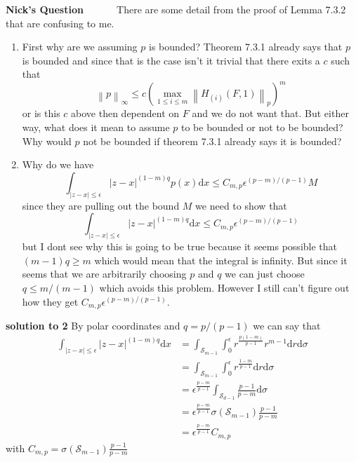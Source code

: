 \documentclass[a4paper,11pt]{article}
\numberwithin{equation}{section}
\theoremstyle{plain}
\theoremstyle{definition}
\newcommand{\ud}{\ensuremath{\mathrm{d}}}
\newcommand{\Norm}[1]{\left\|  #1   \right\|}
\newcounter{NQ}
\newenvironment{NickQuestion}[1][] %
{\refstepcounter{NQ}
	\begin{mdframed}[backgroundcolor=lightgray]\textbf{Nick's Question \theNQ \: #1~~}~~~\noindent}%
	{\end{mdframed}}
\numberwithin{NQ}{section}
\numberwithin{LQ}{section}
\numberwithin{ZQ}{section}
\begin{document}
\begin{NickQuestion}
	There are some detail from the proof of Lemma 7.3.2 that are confusing to me. \begin{enumerate}
		\item First why are we assuming $p$ is bounded? Theorem 7.3.1 already says that $p$ is bounded and since that is the case isn't it trivial that there exits a $c$ such that
		\[
		\Norm{p}_\infty \le c \left( \max_{1 \le i \le m} \Norm{H_{(i)}(F,1)}_p \right)^m
		\]
		or is this $c$ above then dependent on $F$ and we do not want that. But either way, what does it mean to assume $p$ to be bounded or not to be bounded? Why would $p$ not be bounded if theorem 7.3.1 already says it is bounded? 
		
		\item Why do we have 
		\[
			\int_{|z-x| \le \epsilon} |z-x|^{(1-m)q}p(x) \ud x \le C_{m,p}\epsilon^{(p-m)/(p-1)}M
		\]
		since they are pulling out the bound $M$ we need to show that 
		\[ 
			\int_{|z-x| \le \epsilon} |z-x|^{(1-m)q} \ud x \le C_{m,p}\epsilon^{(p-m)/(p-1)}
		\]
		but I dont see why this is going to be true because it seems possible that $(m-1)q \ge m$ which would mean that the integral is infinity. But since it seems that we are arbitrarily choosing $p$ and $q$ we can just choose $q\le m/(m-1)$ which avoids this problem. However I still can't figure out how they get $C_{m,p}\epsilon^{(p-m)/(p-1)}$.
	\end{enumerate}
\end{NickQuestion}
\textbf{solution to 2}
By polar coordinates and $q = p/(p-1)$ we can say that 
\begin{align*}
		\int_{|z-x| \le \epsilon} |z-x|^{(1-m)q} \ud x &= \int_{\mathcal S_{m-1}} \int_0^\epsilon r^{\frac{p(1-m)}{p-1}}r^{m-1} \ud r \ud \sigma
		\\&=  \int_{\mathcal S_{m-1}} \int_0^\epsilon r^{\frac{1-m}{p-1}} \ud r \ud \sigma
		\\& = \epsilon^{\frac{p-m}{p-1}}\int_{\mathcal S_{d-1}} \frac{p-1}{p-m} \ud \sigma 
		\\& =  \epsilon^{\frac{p-m}{p-1}} \sigma(\mathcal S_{m-1})\frac{p-1}{p-m}
		\\& = \epsilon^{\frac{p-m}{p-1}} C_{m,p}
\end{align*}
with $C_{m,p}=\sigma(\mathcal S_{m-1})\frac{p-1}{p-m}$
\end{document}
